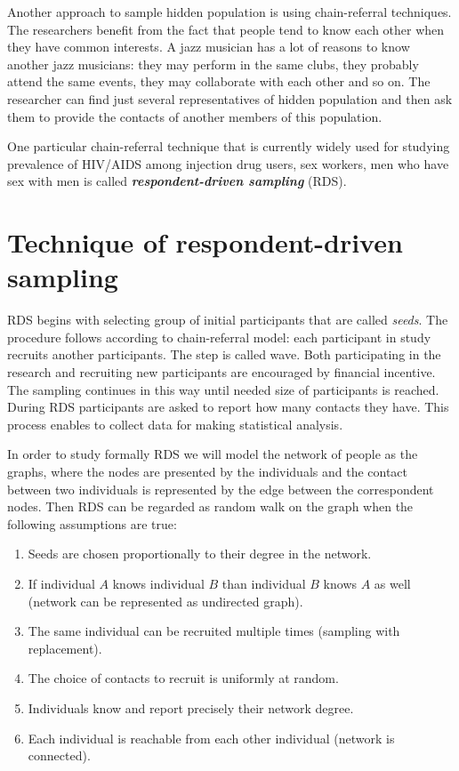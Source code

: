 \documentclass[12pt]{report}
\begin{document}
Another approach to sample hidden population is using chain-referral techniques. The researchers benefit from the fact that people tend to know each other when they have common interests. A jazz musician has a lot of reasons to know another jazz musicians: they may perform in the same clubs, they probably attend the same events, they may collaborate with each other and so on. The researcher can find just several representatives of hidden population and then ask them to provide the contacts of another members of this population.

One particular chain-referral technique that is currently widely used for studying prevalence of HIV/AIDS among injection drug users, sex workers, men who have sex with men is called \textit{\textbf{respondent-driven sampling}} (RDS).


\section{Technique of respondent-driven sampling}
RDS begins with selecting group of initial participants that are called \textit{seeds}. The procedure follows according to chain-referral model: each participant in study recruits another participants. The step is called wave. Both participating in the research and recruiting new participants are encouraged by financial incentive. The sampling continues in this way until needed size of participants is reached. During RDS participants are asked to report how many contacts they have.
This process enables to collect data for making statistical analysis.

In order to study formally RDS we will model the network of people as the graphs, where the nodes are presented by the individuals and the contact between two individuals is represented by the edge between the correspondent nodes. Then RDS can be regarded as random walk on the graph when the following assumptions are true:
\begin{enumerate}
  \item Seeds are chosen proportionally to their degree in the network.  
  \item If individual $A$ knows individual $B$ than individual $B$ knows $A$ as well (network can be represented as undirected graph).
  \item The same individual can be recruited multiple times (sampling with replacement).
  \item The choice of contacts to recruit is uniformly at random.
  \item Individuals know and report precisely their network degree. 
  \item Each individual is reachable from each other individual (network is connected). 
\end{enumerate}
\end{document}
